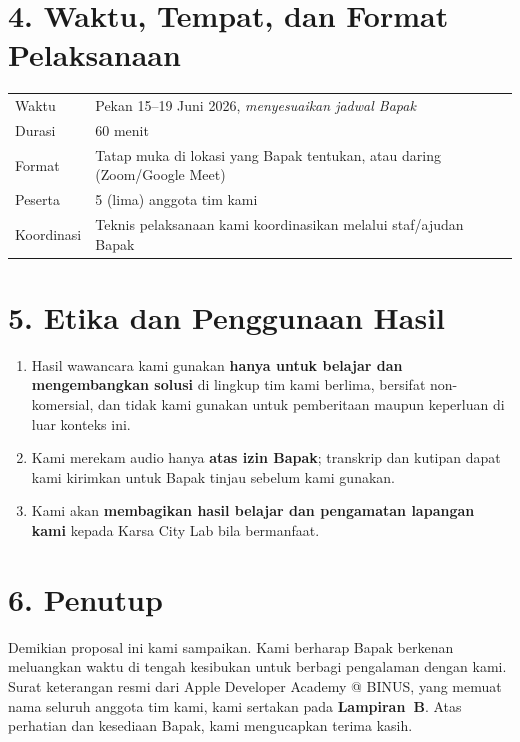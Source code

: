 \documentclass[11pt,a4paper]{article}
\begin{document}
\section*{4. Waktu, Tempat, dan Format Pelaksanaan}

\begin{tabularx}{\textwidth}{@{}lX@{}}
  Waktu & Pekan 15--19 Juni 2026, \textit{menyesuaikan jadwal Bapak} \\
  Durasi & 60 menit \\
  Format & Tatap muka di lokasi yang Bapak tentukan, atau daring (Zoom/Google Meet) \\
  Peserta & 5 (lima) anggota tim kami \\
  Koordinasi & Teknis pelaksanaan kami koordinasikan melalui staf/ajudan Bapak \\
\end{tabularx}

\section*{5. Etika dan Penggunaan Hasil}

\begin{enumerate}[label=\arabic*., itemsep=2pt]
  \item Hasil wawancara kami gunakan \textbf{hanya untuk belajar dan mengembangkan solusi} di lingkup tim kami berlima, bersifat non-komersial, dan tidak kami gunakan untuk pemberitaan maupun keperluan di luar konteks ini.
  \item Kami merekam audio hanya \textbf{atas izin Bapak}; transkrip dan kutipan dapat kami kirimkan untuk Bapak tinjau sebelum kami gunakan.
  \item Kami akan \textbf{membagikan hasil belajar dan pengamatan lapangan kami} kepada Karsa City Lab bila bermanfaat.
\end{enumerate}

\newpage
\section*{6. Penutup}

Demikian proposal ini kami sampaikan. Kami berharap Bapak berkenan meluangkan waktu di tengah kesibukan untuk berbagi pengalaman dengan kami. Surat keterangan resmi dari Apple Developer Academy @ BINUS, yang memuat nama seluruh anggota tim kami, kami sertakan pada \textbf{Lampiran~B}. Atas perhatian dan kesediaan Bapak, kami mengucapkan terima kasih.
\end{document}
